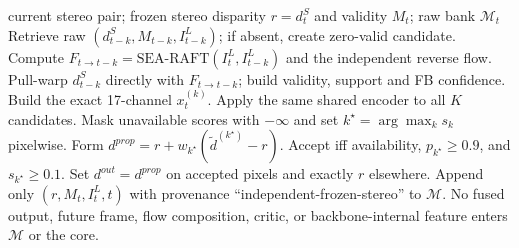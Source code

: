 \begin{algorithm}[t]
\caption{Causal ARGOS v2 geometry-v1 inference}
\label{alg:argos}
\begin{algorithmic}[1]
\Require current stereo pair; frozen stereo disparity $r=d_t^S$ and validity $M_t$; raw bank $\mathcal M_t$
  \State Retrieve raw $(d_{t-k}^S,M_{t-k},I_{t-k}^L)$; if absent, create zero-valid candidate.
    \State Compute $F_{t\to t-k}=\mathrm{SEA\text{-}RAFT}(I_t^L,I_{t-k}^L)$ and the independent reverse flow.
    \State Pull-warp $d_{t-k}^S$ directly with $F_{t\to t-k}$; build validity, support and FB confidence.
  \EndIf
  \State Build the exact 17-channel $x_t^{(k)}$.
\EndFor
\State Apply the same shared encoder to all $K$ candidates.
\State Mask unavailable scores with $-\infty$ and set $k^\star=\arg\max_k s_k$ pixelwise.
\State Form $d^{prop}=r+w_{k^\star}(\widetilde d^{(k^\star)}-r)$.
\State Accept iff availability, $p_{k^\star}\ge0.9$, and $s_{k^\star}\ge0.1$.
\State Set $d^{out}=d^{prop}$ on accepted pixels and exactly $r$ elsewhere.
\State Append only $(r,M_t,I_t^L,t)$ with provenance ``independent-frozen-stereo'' to $\mathcal M$.
\Ensure No fused output, future frame, flow composition, critic, or backbone-internal feature enters $\mathcal M$ or the core.
\end{algorithmic}
\end{algorithm}
